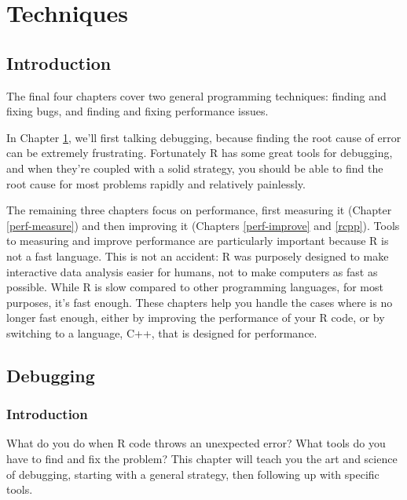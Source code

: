 \documentclass[]{book}
\begin{document}
\hypertarget{part-techniques}{%
\part{Techniques}\label{part-techniques}}

\hypertarget{techniques}{%
\chapter*{Introduction}\label{techniques}}

The final four chapters cover two general programming techniques: finding and fixing bugs, and finding and fixing performance issues.

In Chapter \ref{debugging}, we'll first talking debugging, because finding the root cause of error can be extremely frustrating. Fortunately R has some great tools for debugging, and when they're coupled with a solid strategy, you should be able to find the root cause for most problems rapidly and relatively painlessly.

The remaining three chapters focus on performance, first measuring it (Chapter \ref{perf-measure}) and then improving it (Chapters \ref{perf-improve} and \ref{rcpp}). Tools to measuring and improve performance are particularly important because R is not a fast language. This is not an accident: R was purposely designed to make interactive data analysis easier for humans, not to make computers as fast as possible. While R is slow compared to other programming languages, for most purposes, it's fast enough. These chapters help you handle the cases where is no longer fast enough, either by improving the performance of your R code, or by switching to a language, C++, that is designed for performance.

\hypertarget{debugging}{%
\chapter{Debugging}\label{debugging}}

\hypertarget{introduction-5}{%
\section{Introduction}\label{introduction-5}}


What do you do when R code throws an unexpected error? What tools do you have to find and fix the problem? This chapter will teach you the art and science of debugging, starting with a general strategy, then following up with specific tools.
\end{document}

